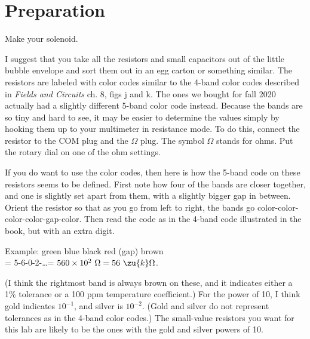 \section*{Preparation}

Make your solenoid.

I suggest that	you take all the resistors and small
capacitors out of the little bubble envelope and sort them out
in an egg carton or something similar. The resistors are labeled
with color codes similar to the 4-band color codes described in \emph{Fields and Circuits} ch. 8, figs j and k.
The ones we bought for fall 2020 actually had a slightly different 5-band color code instead.
Because the bands are so tiny and hard to see, it may be easier to determine the values simply
by hooking them up to your multimeter in resistance mode. To do this, connect the resistor
to the COM plug and the $\Omega$ plug. The symbol $\Omega$ stands for ohms. Put the rotary
dial on one of the ohm settings.

If you do want to use the color codes, then here is how the 5-band code on these resistors
seems to be defined. First note how four of the bands are closer together, and one is
slightly set apart from them, with a slightly bigger gap in between. Orient the resistor so that as you go from left to right,
the bands go color-color-color-color-gap-color. Then read the code as in the 4-band code illustrated
in the book, but with an extra digit.

Example: green blue black red (gap) brown\\
 = 5-6-0-2-\ldots = $560\times10^2\ \Omega = 56\ \zu{k}\Omega$.

(I think the rightmost band is always brown on these, and it indicates either a 1\% tolerance
or a 100 ppm temperature coefficient.)
For the power of 10, I think gold indicates $10^{-1}$, and silver is $10^{-2}$. (Gold and silver
do not represent tolerances as in the 4-band color codes.) The small-value resistors you want
for this lab are likely to be the ones with the gold and silver powers of 10.